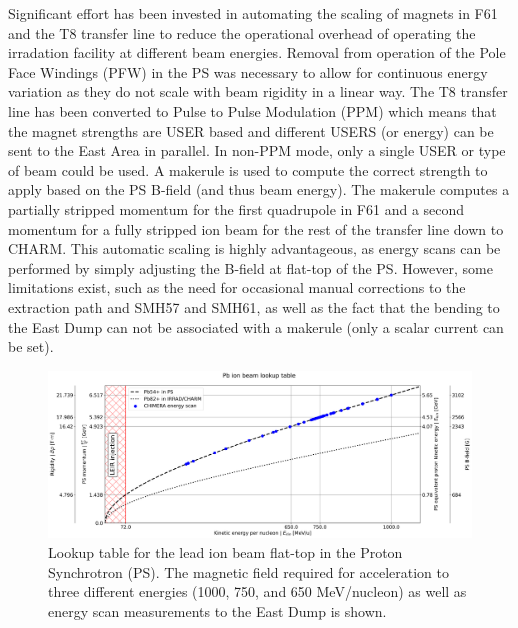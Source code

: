 \documentclass{cernatsnote}
\begin{document}
Significant effort has been invested in automating the scaling of magnets in F61 and the T8 transfer line to reduce the operational overhead of operating the irradation facility at different beam energies. Removal from operation of the Pole Face Windings (PFW) in the PS was necessary to allow for continuous energy variation as they do not scale with beam rigidity in a linear way. The T8 transfer line has been converted to Pulse to Pulse Modulation (PPM) which means that the magnet strengths are USER based and different USERS (or energy) can be sent to the East Area in parallel. In non-PPM mode, only a single USER or type of beam could be used. A makerule is used to compute the correct strength to apply based on the PS B-field (and thus beam energy). The makerule computes a partially stripped momentum for the first quadrupole in F61 and a second momentum for a fully stripped ion beam for the rest of the transfer line down to CHARM. This automatic scaling is highly advantageous, as energy scans can be performed by simply adjusting the B-field at flat-top of the PS. However, some limitations exist, such as the need for occasional manual corrections to the extraction path and SMH57 and SMH61, as well as the fact that the bending to the East Dump can not be associated with a makerule (only a scalar current can be set).
\\

\begin{figure}[!htb]
\centering
\includegraphics[width=1.0\textwidth]{images/PS_BEAM_ENERGY/kinetic_energy_lookup_chimera.png}
\caption{Lookup table for the lead ion beam flat-top in the Proton Synchrotron (PS). The magnetic field required for acceleration to three different energies (1000, 750, and 650 MeV/nucleon) as well as energy scan measurements to the East Dump is shown.}
\label{fig:lookup table}
\end{figure}
\end{document}
